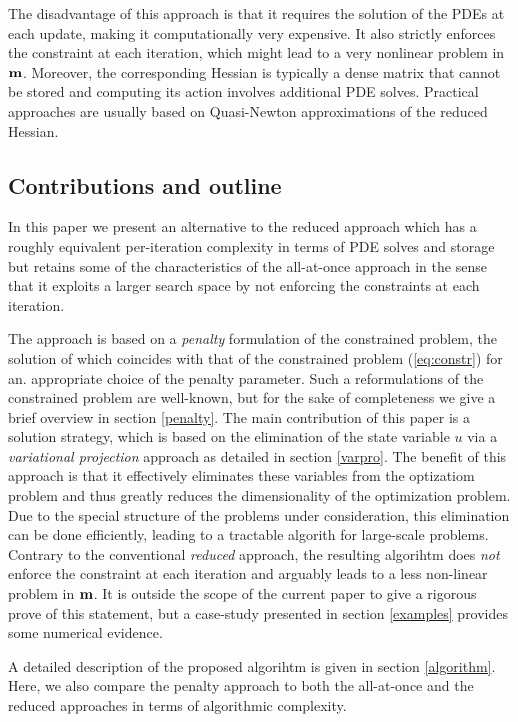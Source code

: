 \documentclass{iopart}
\begin{document}
The disadvantage of this approach is that it
requires the solution of the PDEs at each update, making it computationally very expensive. 
It also strictly enforces the constraint at each iteration, which might lead to a very
nonlinear problem in $\mathbf{m}$. Moreover, the corresponding Hessian is typically a
dense matrix that cannot be stored and computing its action involves additional
PDE solves. Practical approaches are usually based on Quasi-Newton approximations of
the reduced Hessian.

\subsection{Contributions and outline}
In this paper we present an alternative to the reduced approach which
has a roughly equivalent per-iteration complexity in terms of PDE solves
and storage but retains some of the characteristics of the all-at-once
approach in the sense that it exploits a larger search space by not
enforcing the constraints at each iteration.

The approach is based on a \emph{penalty} formulation of the constrained problem,
the solution of which coincides with that of the constrained problem (\ref{eq:constr}) for an. 
appropriate choice of the penalty parameter.
Such a reformulations of the constrained problem are well-known, 
but for the sake of completeness we give a brief overview in section \ref{penalty}. The main contribution
of this paper is a solution strategy, which is based on the elimination of the state variable $u$ via
a \emph{variational projection} approach as detailed in section \ref{varpro}. The benefit of this approach is
that it effectively eliminates these variables from the optizatiom problem and thus greatly reduces the dimensionality
of the optimization problem. Due to the special structure of the problems under consideration, this elimination 
can be done efficiently, leading to a tractable algorith for large-scale problems. 
Contrary to the conventional \emph{reduced} approach, the resulting algorihtm does \emph{not} enforce the constraint
at each iteration and arguably leads to a less non-linear problem in $\mathbf{m}$. It is outside the scope of the current
paper to give a rigorous prove of this statement, but a case-study presented in section
 \ref{examples} provides some numerical evidence.

A detailed description of the proposed algorihtm is given in section \ref{algorithm}.
Here, we also compare the penalty approach to both the all-at-once and the
reduced approaches in terms of algorithmic complexity.
\end{document}
